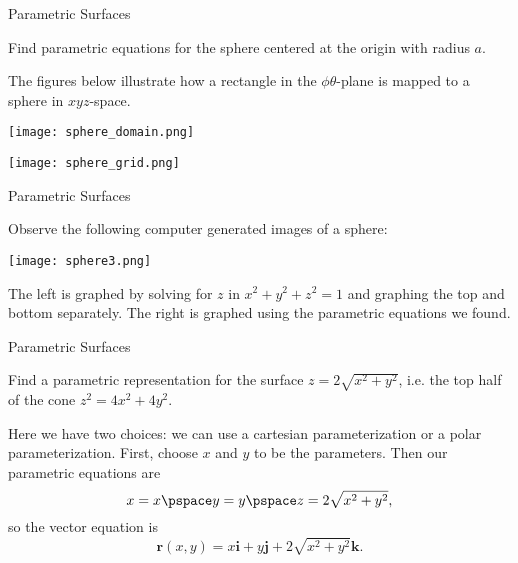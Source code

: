 \documentclass[11pt,english,
handout
]{beamer}
\begin{document}
\begin{frame}[t]{Parametric Surfaces}
\small
\begin{example}
Find parametric equations for the sphere centered at the origin with radius $a$.

\lspace
The figures below illustrate how a rectangle in the $\phi\theta$-plane is mapped to a sphere in $xyz$-space.

\lspace
\begin{minipage}{0.5\textwidth}
\begin{center}
\texttt{[image: sphere\_domain.png]}
\end{center}
\end{minipage}%
\begin{minipage}{0.5\textwidth}
\begin{center}
\texttt{[image: sphere\_grid.png]}
\end{center}
\end{minipage}
\end{example}
\end{frame}












\begin{frame}[t]{Parametric Surfaces}
\small
\begin{example}
Observe the following computer generated images of a sphere:
\begin{center}
\texttt{[image: sphere3.png]}
\end{center}

\lspace
The left is graphed by solving for $z$ in $x^2+y^2+z^2=1$ and graphing the top and bottom separately. The right is graphed using the parametric equations we found.
\end{example}
\end{frame}















\begin{frame}[t]{Parametric Surfaces}
\small
\begin{example}
Find a parametric representation for the surface $z=2\sqrt{x^2+y^2}$, i.e. the top half of the cone $z^2=4x^2+4y^2$.\pause

\lspace
Here we have two choices: we can use a cartesian parameterization or a polar parameterization. \pause First, choose $x$ and $y$ to be the parameters. \pause Then our parametric equations are
\[
x=x\pspace y=y \pspace z=2\sqrt{x^2+y^2},
\]
so the vector equation is
\[
\mathbf{r}(x,y)=x\mathbf{i}+y\mathbf{j}+2\sqrt{x^2+y^2}\mathbf{k}.
\]
\end{example}
\end{frame}
\end{document}
